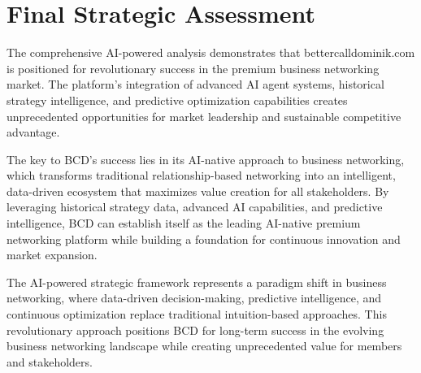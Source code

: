 \section{Final Strategic Assessment}

The comprehensive AI-powered analysis demonstrates that bettercalldominik.com is positioned for revolutionary success in the premium business networking market. The platform's integration of advanced AI agent systems, historical strategy intelligence, and predictive optimization capabilities creates unprecedented opportunities for market leadership and sustainable competitive advantage.

The key to BCD's success lies in its AI-native approach to business networking, which transforms traditional relationship-based networking into an intelligent, data-driven ecosystem that maximizes value creation for all stakeholders. By leveraging historical strategy data, advanced AI capabilities, and predictive intelligence, BCD can establish itself as the leading AI-native premium networking platform while building a foundation for continuous innovation and market expansion.

The AI-powered strategic framework represents a paradigm shift in business networking, where data-driven decision-making, predictive intelligence, and continuous optimization replace traditional intuition-based approaches. This revolutionary approach positions BCD for long-term success in the evolving business networking landscape while creating unprecedented value for members and stakeholders. 